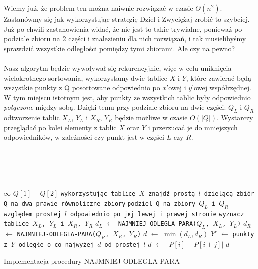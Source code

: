 Wiemy już, że problem ten można naiwnie rozwiązać w czasie $\Theta(n^2)$.
Zastanówmy się jak wykorzystując strategię Dziel i Zwyciężaj zrobić to szybciej.
Już po chwili zastanowienia widać, że nie jest to takie trywialne, ponieważ po podziale zbioru na 2 części i znalezieniu dla nich rozwiązań, i tak musielibyśmy sprawdzić wszystkie odległości pomiędzy tymi zbiorami. 
Ale czy na pewno?
\\\\
Nasz algorytm będzie wywoływał się rekurencyjnie, więc w celu uniknięcia wielokrotnego sortowania, wykorzystamy dwie tablice $X$ i $Y$, które zawierać będą wszystkie punkty z Q posortowane odpowiednio po $x$'owej i $y$'owej współrzędnej.  
W tym miejscu istotnym jest, aby punkty ze wszystkich tablic były odpowiednio \textit{połączone} między sobą.  
Dzięki temu przy podziale zbioru na dwie części: $Q_L$ i $Q_R$ odtworzenie tablic $X_L$, $Y_L$ i $X_R$, $Y_R$ będzie możliwe w czasie $O(|Q|)$.  
Wystarczy przeglądać po kolei elementy z tablic $X$ oraz $Y$ i przerzucać je do mniejszych odpowiedników, w zależności czy punkt jest w części $L$ czy $R$.
\\\\
\begin{algorithm}[H]
 	\DontPrintSemicolon
  	\\
  	\\
  	\\
    	  { \Return $\infty$ }
         {\Return $Q[1] - Q[2]$}
		\texttt{wykorzystując tablicę $X$ znajdź prostą $l$ dzielącą zbiór Q na dwa prawie równoliczne zbiory}\;
		\texttt{podziel Q na zbiory $Q_L$ i $Q_R$ względem prostej $l$ odpowiednio po jej lewej i prawej stronie}\;
        \texttt{wyznacz tablice $X_L$, $Y_L$ i $X_R$, $Y_R$}\;
        $d_L$ $\leftarrow$ \texttt{NAJMNIEJ-ODLEGLA-PARA($Q_L$, $X_L$, $Y_L$)}\;
        $d_R$ $\leftarrow$ \texttt{NAJMNIEJ-ODLEGLA-PARA($Q_R$, $X_R$, $Y_R$)}\;
         $d$ $\leftarrow$ $\min{(d_L, d_R)}$\;
         $Y'$ $\leftarrow$ \texttt{punkty z $Y$ odległe o co najwyżej $d$ od prostej $l$}\;
          {
         	 {
            	 {
                	$d$ $\leftarrow$ $|P[i] - P[i+j]|$
                }
            }
         }
        \Return $d$
  	\caption{Implementacja procedury NAJMNIEJ-ODLEGLA-PARA}
\end{algorithm}
